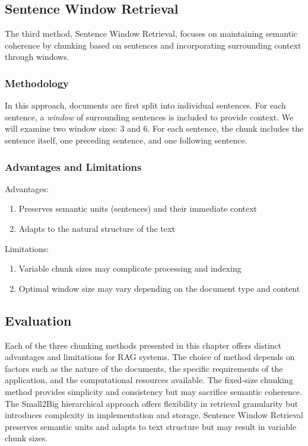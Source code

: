 \subsection{Sentence Window Retrieval}\label{subsec:sentence-window-retrieval}
The third method, Sentence Window Retrieval, focuses on maintaining semantic coherence by chunking based on sentences and incorporating surrounding context through windows.
\subsubsection{Methodology}
In this approach, documents are first split into individual sentences.
For each sentence, a \textit{window} of surrounding sentences is included to provide context.
We will examine two window sizes: 3 and 6.
For each sentence, the chunk includes the sentence itself, one preceding sentence, and one following sentence.

\subsubsection{Advantages and Limitations}
Advantages:
\begin{enumerate}
    \item Preserves semantic units (sentences) and their immediate context
    \item Adapts to the natural structure of the text
\end{enumerate}
Limitations:
\begin{enumerate}
    \item Variable chunk sizes may complicate processing and indexing
    \item Optimal window size may vary depending on the document type and content
\end{enumerate}
\subsection{Evaluation}\label{subsec:evaluation}
Each of the three chunking methods presented in this chapter offers distinct advantages and limitations for RAG systems. 
The choice of method depends on factors such as the nature of the documents, the specific requirements of the application, and the computational resources available.
The fixed-size chunking method provides simplicity and consistency but may sacrifice semantic coherence. 
The Small2Big hierarchical approach offers flexibility in retrieval granularity but introduces complexity in implementation and storage. 
Sentence Window Retrieval preserves semantic units and adapts to text structure but may result in variable chunk sizes.

